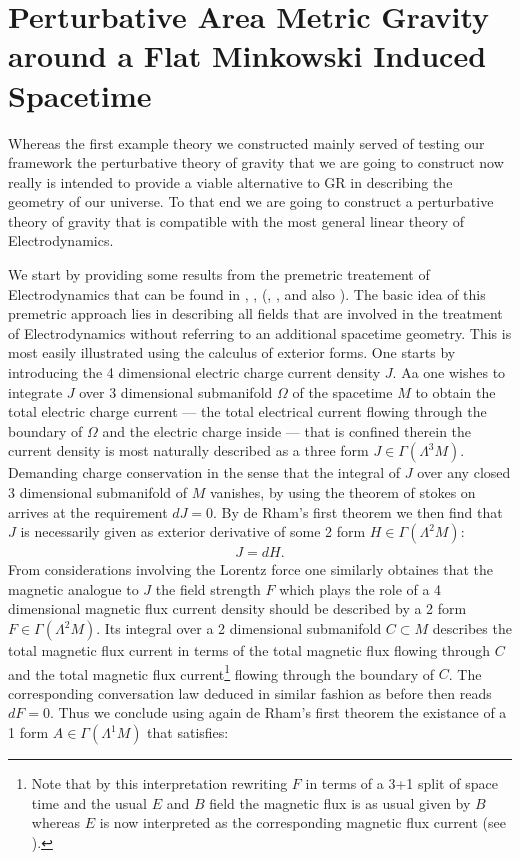 \documentclass[a4paper,12pt, DIV=14, BCOR=5mm, twoside, headsepline, numbers=noenddot]{scrbook}
\begin{document}
\section{Perturbative Area Metric Gravity around a Flat Minkowski Induced Spacetime}
Whereas the first example theory we constructed mainly served of testing our framework the perturbative theory of gravity that we are going to construct now really is intended to provide a viable alternative to GR in describing the geometry of our universe.  
To that end we are going to construct a perturbative theory of gravity that is compatible with the most general linear theory of Electrodynamics. 

We start by providing some results from the premetric treatement of Electrodynamics that can be found in \cite{1999PhLB..458..466O}, \cite{1999gr.qc....11096H}, (\cite{hehl2003foundations}, \cite{2006physics..10221H}, \cite{2004PhRvD..70j5022L} and also \cite{Hehl2005}). The basic idea of this premetric approach lies in describing all fields that are involved in the treatment of Electrodynamics without referring to an additional spacetime geometry. This is most easily illustrated using the calculus of exterior forms. One starts by introducing the 4 dimensional electric charge current density $J$. Aa one wishes to integrate $J$ over 3 dimensional submanifold $\Omega$ of the spacetime $M$ to obtain the total electric charge current --- the total electrical current flowing through the boundary of $\Omega$ and the electric charge inside --- that is confined therein the current density is most naturally described as a three form $J \in \Gamma(\Lambda^3M)$. Demanding charge conservation in the sense that the integral of $J$ over any closed 3 dimensional submanifold of $M$ vanishes, by using the theorem of stokes on arrives at the requirement $dJ =0$. By de Rham's first theorem we then find that $J$ is necessarily given as exterior derivative of some 2 form $H \in \Gamma(\Lambda^2M)$:
\begin{align}
    J = d H.
\end{align}
From considerations involving the Lorentz force one similarly obtaines that the magnetic analogue to $J$ the field strength $F$ which plays the role of a 4 dimensional magnetic flux current density should be described by a 2 form $F \in \Gamma(\Lambda^2M)$. Its integral over a 2 dimensional submanifold $C \subset M$ describes the total magnetic flux current in terms of the total magnetic flux flowing through $C$ and the total magnetic flux current\footnote{Note that by this interpretation rewriting $F$ in terms of a 3+1 split of space time and the usual $E$ and $B$ field the magnetic flux is as usual given by $B$ whereas $E$ is now interpreted as the corresponding magnetic flux current (see \cite{2006physics..10221H}).} flowing through the boundary of $C$. The corresponding conversation law deduced in similar fashion as before then reads $dF =0$. Thus we conclude using again de Rham's first theorem the existance of a 1 form $A \in \Gamma(\Lambda^1M)$ that satisfies:
\end{document}
